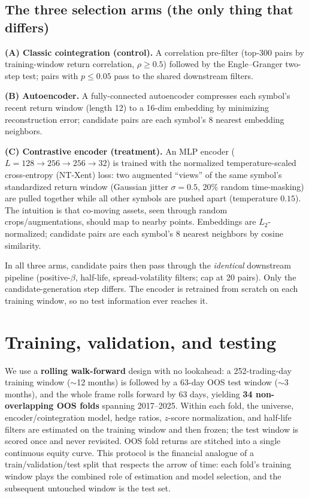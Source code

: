 \documentclass[11pt]{article}
\begin{document}
\subsection{The three selection arms (the only thing that differs)}
\textbf{(A) Classic cointegration (control).} A correlation pre-filter (top-300 pairs
by training-window return correlation, $\rho\geq0.5$) followed by the Engle--Granger
two-step test; pairs with $p\leq0.05$ pass to the shared downstream filters.

\textbf{(B) Autoencoder.} A fully-connected autoencoder compresses each symbol's
recent return window (length 12) to a 16-dim embedding by minimizing reconstruction
error; candidate pairs are each symbol's 8 nearest embedding neighbors.

\textbf{(C) Contrastive encoder (treatment).} An MLP encoder
($L{=}128\!\to\!256\!\to\!256\!\to\!32$) is trained with the normalized
temperature-scaled cross-entropy (NT-Xent) loss: two augmented ``views'' of the same
symbol's standardized return window (Gaussian jitter $\sigma{=}0.5$, 20\% random
time-masking) are pulled together while all other symbols are pushed apart
(temperature $0.15$). The intuition is that co-moving assets, seen through random
crops/augmentations, should map to nearby points. Embeddings are $L_2$-normalized;
candidate pairs are each symbol's 8 nearest neighbors by cosine similarity.

In all three arms, candidate pairs then pass through the \emph{identical} downstream
pipeline (positive-$\beta$, half-life, spread-volatility filters; cap at 20 pairs).
Only the candidate-generation step differs. The encoder is retrained from scratch on
each training window, so no test information ever reaches it.

\section{Training, validation, and testing}
We use a \textbf{rolling walk-forward} design with no lookahead: a 252-trading-day
training window ($\sim$12 months) is followed by a 63-day OOS test window
($\sim$3 months), and the whole frame rolls forward by 63 days, yielding
\textbf{34 non-overlapping OOS folds} spanning 2017--2025. Within each fold, the
universe, encoder/cointegration model, hedge ratios, $z$-score normalization, and
half-life filters are estimated on the training window and then frozen; the test
window is scored once and never revisited. OOS fold returns are stitched into a single
continuous equity curve. This protocol is the financial analogue of a
train/validation/test split that respects the arrow of time: each fold's training
window plays the combined role of estimation and model selection, and the subsequent
untouched window is the test set.
\end{document}

